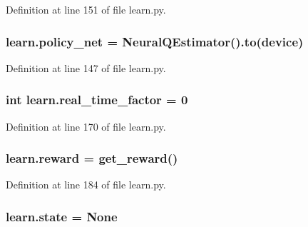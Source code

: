 Definition at line 151 of file learn.\+py.

\subsubsection[{\texorpdfstring{policy\+\_\+net}{policy_net}}]{\setlength{\rightskip}{0pt plus 5cm}learn.\+policy\+\_\+net = {\bf Neural\+Q\+Estimator}().to({\bf device})}\hypertarget{namespacelearn_aff1270198d684f1b88420d8ecbf660f0}{}\label{namespacelearn_aff1270198d684f1b88420d8ecbf660f0}


Definition at line 147 of file learn.\+py.

\subsubsection[{\texorpdfstring{real\+\_\+time\+\_\+factor}{real_time_factor}}]{\setlength{\rightskip}{0pt plus 5cm}int learn.\+real\+\_\+time\+\_\+factor = 0}\hypertarget{namespacelearn_a9b863a68264a65e5330ea30ef3765f9e}{}\label{namespacelearn_a9b863a68264a65e5330ea30ef3765f9e}


Definition at line 170 of file learn.\+py.

\subsubsection[{\texorpdfstring{reward}{reward}}]{\setlength{\rightskip}{0pt plus 5cm}learn.\+reward = {\bf get\+\_\+reward}()}\hypertarget{namespacelearn_acfe9ef43af1b064075a2d4c52cb54340}{}\label{namespacelearn_acfe9ef43af1b064075a2d4c52cb54340}


Definition at line 184 of file learn.\+py.

\subsubsection[{\texorpdfstring{state}{state}}]{\setlength{\rightskip}{0pt plus 5cm}learn.\+state = None}\hypertarget{namespacelearn_a48d8007f4bd73948e2b7683cd736edfc}{}\label{namespacelearn_a48d8007f4bd73948e2b7683cd736edfc}



